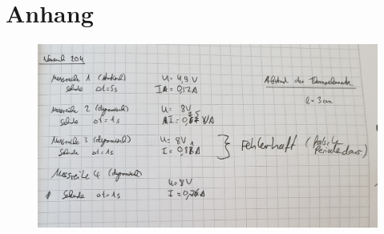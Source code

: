 \section{Anhang}

\begin{figure}[H]
    \centering
    \includegraphics[width=13cm]{content/anhang.jpg}
\end{figure}